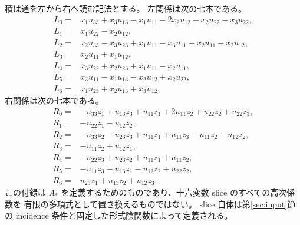 積は道を左から右へ読む記法とする。
左関係は次の七本である。
\begin{align*}
L_0={}&x_1u_{33}+x_3u_{13}-x_1u_{11}-2x_2u_{12}+x_2u_{22}-x_3u_{22},\\
L_1={}&x_1u_{22}-x_2u_{12},\\
L_2={}&x_2u_{33}-x_3u_{23}+x_1u_{11}-x_3u_{11}-x_2u_{11}-x_2u_{12},\\
L_3={}&x_2u_{11}+x_1u_{12},\\
L_4={}&x_3u_{22}+x_2u_{23}+x_1u_{11}-x_2u_{11},\\
L_5={}&x_3u_{11}-x_1u_{13}-x_2u_{12}+x_2u_{22},\\
L_6={}&x_1u_{23}+x_2u_{13}+x_3u_{12}.
\end{align*}
右関係は次の七本である。
\begin{align*}
R_0={}&-u_{33}z_1+u_{13}z_3+u_{11}z_1+2u_{11}z_2+u_{22}z_2+u_{22}z_3,\\
R_1={}&-u_{22}z_1-u_{12}z_2,\\
R_2={}&-u_{33}z_2-u_{23}z_3+u_{11}z_1+u_{11}z_3-u_{11}z_2-u_{12}z_2,\\
R_3={}&-u_{11}z_2+u_{12}z_1,\\
R_4={}&-u_{22}z_3+u_{23}z_2+u_{11}z_1+u_{11}z_2,\\
R_5={}&-u_{11}z_3-u_{13}z_1-u_{12}z_2+u_{22}z_2,\\
R_6={}&u_{23}z_1+u_{13}z_2+u_{12}z_3.
\end{align*}
この付録は $A_*$ を定義するためのものであり、十六変数 slice のすべての高次係数を
有限の多項式として置き換えるものではない。
slice 自体は第\ref{sec:input}節の incidence 条件と固定した形式陰関数によって定義される。

